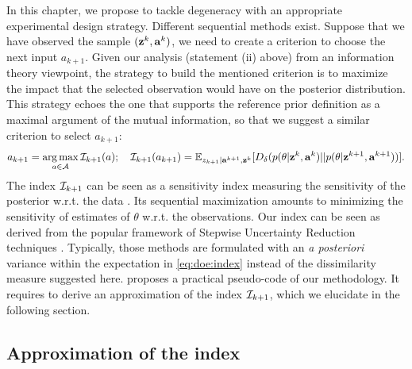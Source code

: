 In this chapter, we propose to tackle degeneracy with an appropriate experimental design strategy. 
Different sequential methods exist. Suppose that we have observed the sample $(\mathbf{z}^k,\mathbf{a}^k)$, we need to create a criterion to choose the next input $a_{k+1}$. 
Given our analysis (statement (ii) above) from an information theory viewpoint, the strategy to build the mentioned criterion is to maximize the impact that the selected observation would have on the posterior distribution. 
This strategy echoes the one that supports the reference prior definition as a maximal argument of the mutual information, so that we suggest a similar criterion to select $a_{k+1}$:
      \begin{equation}\label{eq:doe:index}
        a_{k+1}=\operatorname*{arg\,max}_{a\in\mathcal{A}}\mathcal{I}_{k+1}(a);\quad 
            \mathcal{I}_{k+1}(a_{k+1}) = \mathbb{E}_{{z_{k+1}}|\mathbf{a}^{k+1},\mathbf{z}^k}[D_\delta(p(\theta|\mathbf{z}^k,\mathbf{a}^k)||p(\theta|\mathbf{z}^{k+1},\mathbf{a}^{k+1}))].
    \end{equation}
The index $\mathcal{I}_{k+1}$ can be seen as a sensitivity index measuring the sensitivity of the posterior w.r.t. the data \citep{da_veiga_global_2015}. Its sequential maximization amounts to minimizing the sensitivity of estimates of $\theta$ w.r.t. the observations.
Our index can be seen as derived from the popular framework of Stepwise Uncertainty Reduction techniques \citep{bect_supermartingale_2019}. 
Typically,  those methods are formulated with an \emph{a posteriori} variance within the expectation in \cref{eq:doe:index} instead of the dissimilarity measure suggested here.
 proposes a practical pseudo-code of our methodology. It requires to derive an approximation of the index $\mathcal{I}_{k+1}$, which we elucidate in the following section.


\subsection{Approximation of the index}

